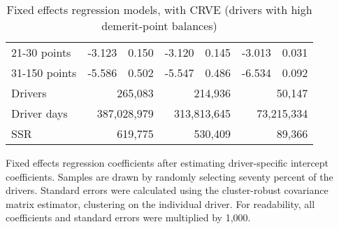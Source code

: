 \begin{table}
\begin{tabular}{l r r r r r r}
21-30 points  & -3.123  &  0.150  & -3.120  &  0.145  & -3.013  &  0.031   \\ 
 
31-150 points  & -5.586  &  0.502  & -5.547  &  0.486  & -6.534  &  0.092   \\ 
 

\hline 
 

Drivers 
 & \multicolumn{2}{r}{265,083}  & \multicolumn{2}{r}{214,936}  & \multicolumn{2}{r}{50,147}   \\ 
 

Driver days 
 & \multicolumn{2}{r}{387,028,979}  & \multicolumn{2}{r}{313,813,645}  & \multicolumn{2}{r}{73,215,334}   \\ 
 

SSR 
 & \multicolumn{2}{r}{619,775}  & \multicolumn{2}{r}{530,409}  & \multicolumn{2}{r}{89,366}   \\ 
 

\hline 
 
\end{tabular} 
\caption{Fixed effects regression models, with CRVE (drivers with high demerit-point balances)} 
Fixed effects regression coefficients after estimating driver-specific intercept coefficients. 
Samples are drawn by randomly selecting seventy percent of the drivers. 
Standard errors were calculated using the cluster-robust covariance matrix estimator, 
clustering on the individual driver. 
For readability, all coefficients and standard errors were multiplied by 1,000.
\label{tab:FE_regs_CRVE_high_pts} 
\end{table} 
 
